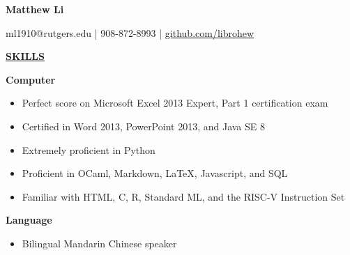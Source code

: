 \documentclass[
]{article}
\author{}
\date{\vspace{-2.5em}}
\providecommand{\tightlist}{%
  \setlength{\itemsep}{0pt}\setlength{\parskip}{0pt}}
\begin{document}

\begin{center}

\textbf{Matthew Li}

\end{center}

\begin{center}
ml1910@rutgers.edu
| 908-872-8993 | \href{https://www.github.com/librohew}{github.com/librohew}   
\end{center}

\textbf{\underline{SKILLS}}

\textbf{Computer}

\begin{itemize}
\item
  Perfect score on Microsoft Excel 2013 Expert, Part 1 certification
  exam
\item
  Certified in Word 2013, PowerPoint 2013, and Java SE 8
\end{itemize}

\begin{itemize}
\item
  Extremely proficient in Python
\item
  Proficient in OCaml, Markdown, LaTeX, Javascript, and SQL
\item
  Familiar with HTML, C, R, Standard ML, and the RISC-V
  Instruction Set
\end{itemize}

\textbf{Language}

\begin{itemize}
\item
 Bilingual Mandarin Chinese speaker 
\end{itemize}




\end{document}
